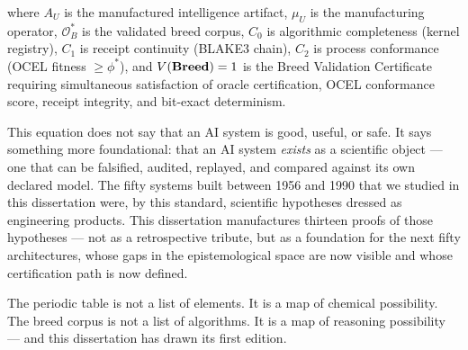 \noindent
where $A_U$ is the manufactured intelligence artifact, $\mu_U$ is the manufacturing
operator, $\mathcal{O}^*_B$ is the validated breed corpus, $C_0$ is algorithmic
completeness (kernel registry), $C_1$ is receipt continuity (BLAKE3 chain), $C_2$ is
process conformance (OCEL fitness $\geq \phi^*$), and $V(\mathbf{Breed}) = 1$ is the Breed
Validation Certificate requiring simultaneous satisfaction of oracle certification,
OCEL conformance score, receipt integrity, and bit-exact determinism.

This equation does not say that an AI system is good, useful, or safe. It says something
more foundational: that an AI system \emph{exists} as a scientific object — one that can
be falsified, audited, replayed, and compared against its own declared model. The fifty
systems built between 1956 and 1990 that we studied in this dissertation were, by this
standard, scientific hypotheses dressed as engineering products. This dissertation
manufactures thirteen proofs of those hypotheses — not as a retrospective tribute, but as
a foundation for the next fifty architectures, whose gaps in the epistemological space are
now visible and whose certification path is now defined.

The periodic table is not a list of elements. It is a map of chemical possibility.
The breed corpus is not a list of algorithms. It is a map of reasoning possibility — and
this dissertation has drawn its first edition.
